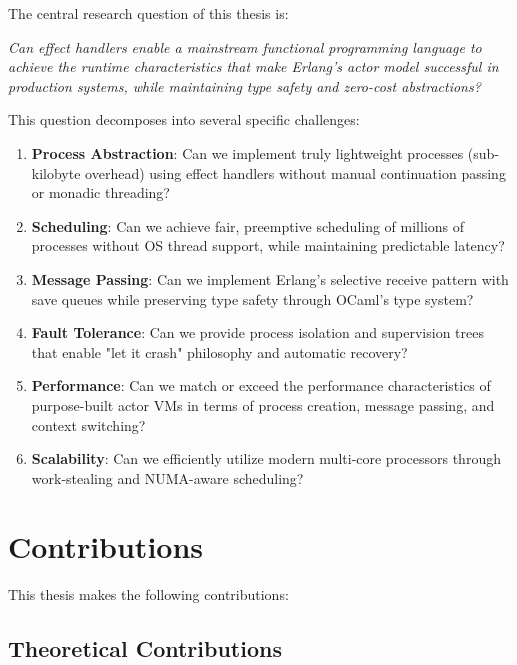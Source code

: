 \documentclass[12pt,a4paper]{report}
\begin{document}
The central research question of this thesis is:

\textit{Can effect handlers enable a mainstream functional programming language to achieve the runtime characteristics that make Erlang's actor model successful in production systems, while maintaining type safety and zero-cost abstractions?}

This question decomposes into several specific challenges:

\begin{enumerate}
\item \textbf{Process Abstraction}: Can we implement truly lightweight processes (sub-kilobyte overhead) using effect handlers without manual continuation passing or monadic threading?

\item \textbf{Scheduling}: Can we achieve fair, preemptive scheduling of millions of processes without OS thread support, while maintaining predictable latency?

\item \textbf{Message Passing}: Can we implement Erlang's selective receive pattern with save queues while preserving type safety through OCaml's type system?

\item \textbf{Fault Tolerance}: Can we provide process isolation and supervision trees that enable "let it crash" philosophy and automatic recovery?

\item \textbf{Performance}: Can we match or exceed the performance characteristics of purpose-built actor VMs in terms of process creation, message passing, and context switching?

\item \textbf{Scalability}: Can we efficiently utilize modern multi-core processors through work-stealing and NUMA-aware scheduling?
\end{enumerate}

\section{Contributions}

This thesis makes the following contributions:

\subsection{Theoretical Contributions}
\end{document}
